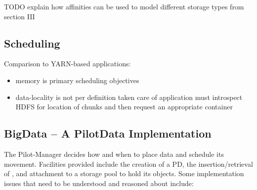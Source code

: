 \documentclass[conference]{IEEEtran}
\begin{document}
TODO
explain how affinities can be used to model different storage types from section III

\subsection{Scheduling}

Comparison to YARN-based applications:
\begin{itemize}
	\item memory is primary scheduling objectives
	\item data-locality is not per definition taken care of application must 
	introspect HDFS for location of chunks and then request an appropriate 
	container
\end{itemize}


\subsection{BigData -- A PilotData Implementation}


The Pilot-Manager decides how and when to place data and
schedule its movement. Facilities provided include the creation of a
PD, the insertion/retrieval of \dataunits, and attachment to a storage
pool to hold its objects. Some implementation issues that need to be
understood and reasoned about include:

\end{document}

